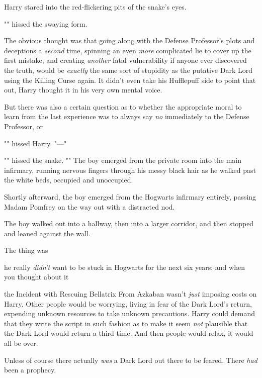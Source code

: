 Harry stared into the red-flickering pits of the snake's eyes.

"" hissed the swaying form.

The obvious thought was that going along with the Defense Professor's plots and
deceptions a \emph{second} time, spinning an even \emph{more} complicated lie
to cover up the first mistake, and creating \emph{another} fatal vulnerability
if anyone ever discovered the truth, would be \emph{exactly} the same sort of
stupidity as the putative Dark Lord using the Killing Curse again. It didn't
even take his Hufflepuff side to point that out, Harry thought it in his very
own mental voice.

But there was also a certain question as to whether the appropriate moral to
learn from the last experience was to always say \emph{no} immediately to the
Defense Professor, or{\el}

"" hissed Harry. "\mbox{---}"

"" hissed the snake. ""
\sbreak
The boy emerged from the private room into the main infirmary, running nervous
fingers through his messy black hair as he walked past the white beds, occupied
and unoccupied.

Shortly afterward, the boy emerged from the Hogwarts infirmary entirely,
passing Madam Pomfrey on the way out with a distracted nod.

The boy walked out into a hallway, then into a larger corridor, and then
stopped and leaned against the wall.

The thing was{\el}

{\el} he really \emph{didn't} want to be stuck in Hogwarts for the next six
years; and when you thought about it{\el}

{\el} the Incident with Rescuing Bellatrix From Azkaban wasn't \emph{just}
imposing costs on Harry. Other people would be worrying, living in fear of the
Dark Lord's return, expending unknown resources to take unknown precautions.
Harry could demand that they write the script in such fashion as to make it
seem \emph{not} plausible that the Dark Lord would return a third time. And
then people would relax, it would all be over.

Unless of course there actually \emph{was} a Dark Lord out there to be feared.
There \emph{had} been a prophecy.

